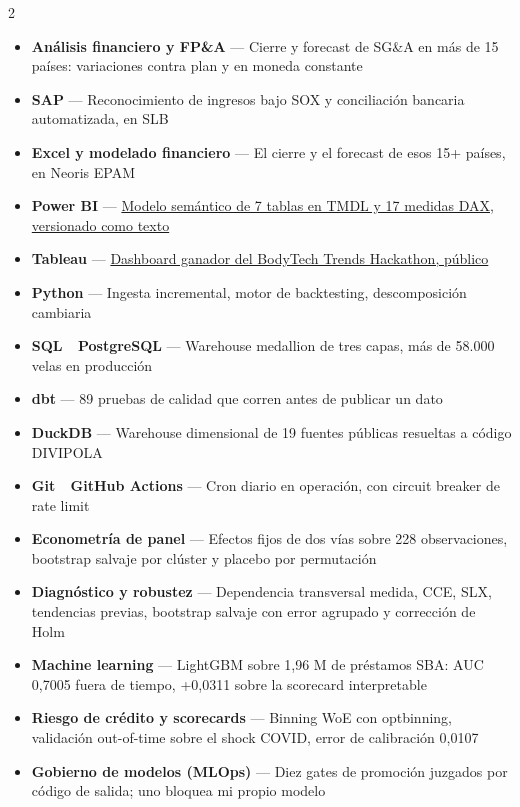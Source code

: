 \documentclass[a4paper,10pt]{article}
\begin{document}
\begin{multicols}{2}
\begin{itemize}[leftmargin=1.1em, itemsep=1pt, topsep=0pt, parsep=0pt]
  \item \textbf{\color{ink}Análisis financiero y FP\&A} --- Cierre y forecast de SG\&A en más de 15 países: variaciones contra plan y en moneda constante
  \item \textbf{\color{ink}SAP} --- Reconocimiento de ingresos bajo SOX y conciliación bancaria automatizada, en SLB
  \item \textbf{\color{ink}Excel y modelado financiero} --- El cierre y el forecast de esos 15+ países, en Neoris EPAM
  \item \textbf{\color{ink}Power BI} --- \href{https://davirson.com/es/projects/powerbi}{Modelo semántico de 7 tablas en TMDL y 17 medidas DAX, versionado como texto}
  \item \textbf{\color{ink}Tableau} --- \href{https://public.tableau.com/app/profile/davirson.novoa/viz/BodyTrendsADataAnalysisProject/TrendsAnalysis}{Dashboard ganador del BodyTech Trends Hackathon, público}
  \item \textbf{\color{ink}Python} --- Ingesta incremental, motor de backtesting, descomposición cambiaria
  \item \textbf{\color{ink}SQL \,\textperiodcentered\, PostgreSQL} --- Warehouse medallion de tres capas, más de 58.000 velas en producción
  \item \textbf{\color{ink}dbt} --- 89 pruebas de calidad que corren antes de publicar un dato
  \item \textbf{\color{ink}DuckDB} --- Warehouse dimensional de 19 fuentes públicas resueltas a código DIVIPOLA
  \item \textbf{\color{ink}Git \,\textperiodcentered\, GitHub Actions} --- Cron diario en operación, con circuit breaker de rate limit
  \item \textbf{\color{ink}Econometría de panel} --- Efectos fijos de dos vías sobre 228 observaciones, bootstrap salvaje por clúster y placebo por permutación
  \item \textbf{\color{ink}Diagnóstico y robustez} --- Dependencia transversal medida, CCE, SLX, tendencias previas, bootstrap salvaje con error agrupado y corrección de Holm
  \item \textbf{\color{ink}Machine learning} --- LightGBM sobre 1,96 M de préstamos SBA: AUC 0,7005 fuera de tiempo, +0,0311 sobre la scorecard interpretable
  \item \textbf{\color{ink}Riesgo de crédito y scorecards} --- Binning WoE con optbinning, validación out-of-time sobre el shock COVID, error de calibración 0,0107
  \item \textbf{\color{ink}Gobierno de modelos (MLOps)} --- Diez gates de promoción juzgados por código de salida; uno bloquea mi propio modelo
\end{itemize}
\end{multicols}
\end{document}
